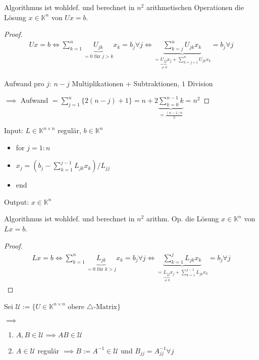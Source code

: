\begin{lemma}
	Algorithmus ist wohldef. und berechnet in $n^2$ arithmetischen Operationen die Lösung $x \in \mathbb{K}^n$ von $Ux=b$.
\end{lemma}

\begin{proof}
	\begin{align*}
		Ux = b \iff \sum_{k=1}^{n} \underbrace{U_{jk}}_{=0 \text{ für } j>k} x_k = b_j \forall j \iff
		\underbrace{\sum_{k=j}^{n} U_{jk} x_k}_{=\underbrace{U_{jj}}_{\neq 0} x_j + \sum_{k=j+1}^{n} U_{jk} x_k} = b_j \forall j
	\end{align*}
	
	Aufwand pro $j$: $n-j$ Multiplikationen + Subtraktionen, $1$ Division
	
	$\implies$ Aufwand $= \sum_{j=1}^{n} \{2(n-j) + 1\} = n + 2\underbrace{\sum_{k=0}^{n-1}k}_{=\frac{(n-1)n}{2}} = n^2$
\end{proof}

\begin{algorithm}
	Input: $L \in \mathbb{K}^{n\times n}$ regulär, $b \in \mathbb{K}^n$
	\begin{itemize}
		\item for $j=1:n$
		\item \hspace{0.5cm} $x_j = \left(b_j - \sum_{k=1}^{j-1} L_{jk} x_k\right)/L_{jj}$
		\item end
	\end{itemize}
	Output: $x \in \mathbb{K}^n$
\end{algorithm}

\begin{lemma}
	Algorithmus ist wohldef. und berechnet in $n^2$ arithm. Op. die Lösung $x \in \mathbb{K}^n$ von $Lx=b$.
\end{lemma}

\begin{proof}
	\begin{align*}
		Lx = b \iff \sum_{k=1}^{n} \underbrace{L_{jk}}_{=0 \text{ für } k>j} x_k = b_j \forall j \iff
		\underbrace{\sum_{k=1}^{j} L_{jk} x_k}_{=\underbrace{L_{jj}}_{\neq 0} x_j + \sum_{k=1}^{j-1} L_{jk} x_k} = b_j \forall j
	\end{align*}
\end{proof}

\begin{lemma}
	Sei $\mathcal{U} := \{U \in \mathbb{K}^{n\times n} \text{ obere } \triangle\text{-Matrix}\}$
	
	$\implies$
	\begin{enumerate}
		\item $A, B \in \mathcal{U} \implies AB \in \mathcal{U}$
		\item $A \in \mathcal{U}$ regulär $\implies B:=A^{-1} \in \mathcal{U}$ und $B_{jj}=A_{jj}^{-1} \forall j$
	\end{enumerate}
\end{lemma}

